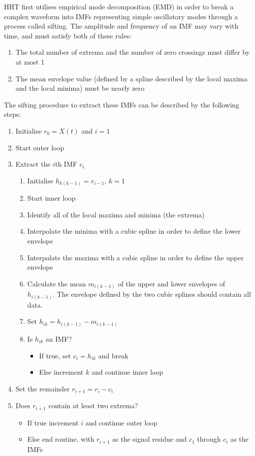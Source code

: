 \documentclass[
  english,
  paper=a4,
  oneside  ,captions=tableheading
]{scrbook}
\begin{document}
HHT first utilises empirical mode decomposition (EMD) in order to break
a complex waveform into IMFs representing simple oscillatory modes
through a process called sifting. The amplitude and frequency of an IMF
may vary with time, and must satisfy both of these rules: 

\begin{enumerate}
	\item The total number of extrema and the number of zero crossings must differ by at most 1 
	\item The mean envelope value (defined by a spline described by the local maxima and the local minima) must be nearly zero
\end{enumerate}

The sifting procedure to extract these IMFs can be described by the following steps: 

\begin{enumerate}
	\item Initialise \(r_0 = X(t)\) and \(i = 1\)
	\item Start outer loop 
	\item Extract the \(i\)th IMF \(c_i\)
	\begin{enumerate}
		\item Initialise \(h_{k(k-1)} = r_{i-1}\), \(k = 1\)
		\item Start inner loop
		\item Identify all of the local maxima and minima (the extrema)
		\item Interpolate the minima with a cubic spline in order to define the lower envelope
		\item Interpolate the maxima with a cubic spline in order to define the upper envelope
		\item Calculate the mean \(m_{i(k-1)}\) of the upper and lower envelopes of \(h_{i(k-1)}\). The envelope defined by the two cubic splines should contain all data.
		\item Set \(h_{ik} = h_{i(k-1)} - m_{i(k-1)}\)
		\item Is \(h_{ik}\) an IMF? 
		\begin{itemize}
			\item If true, set \(c_i = h_{ik}\) and break 
			\item Else increment \(k\) and continue inner loop
		\end{itemize}
	\end{enumerate}
	\item Set the remainder \(r_{i+1} = r_i - c_i\)
	\item Does \(r_{i + 1}\) contain at least two extrema?
	\begin{itemize}
		\item If true increment \(i\) and continue outer loop
		\item Else end routine, with \(r_{i + 1}\) as the signal residue and \(c_1\) through \(c_i\) as the IMFs
	\end{itemize}
\end{enumerate}
\end{document}
